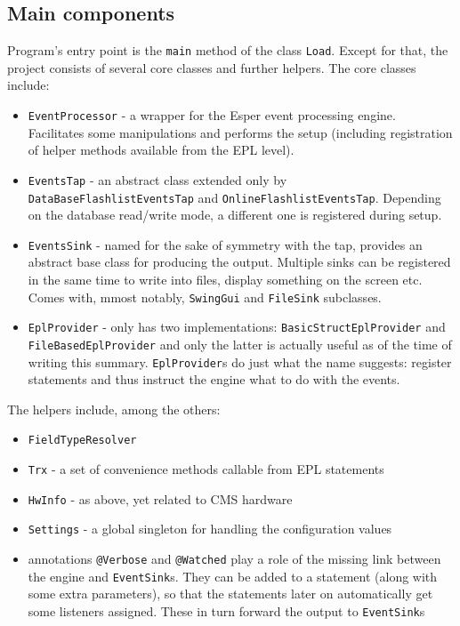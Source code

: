 \subsection{Main components}

Program's entry point is the \texttt{main} method of the class \texttt{Load}. Except for that, the project consists of several core classes and further helpers.
The core classes include:
\begin{itemize}
	\item \texttt{EventProcessor} - a wrapper for the Esper event processing engine. Facilitates some manipulations and performs the setup (including registration of helper methods available from the EPL level).
	\item \texttt{EventsTap} - an abstract class extended only by \texttt{DataBaseFlashlistEventsTap} and \texttt{OnlineFlashlistEventsTap}. Depending on the database read/write mode, a different one is registered during setup.
	\item \texttt{EventsSink} - named for the sake of symmetry with the tap, provides an abstract base class for producing the output. Multiple sinks can be registered in the same time to write into files, display something on the screen etc. Comes with, mmost notably, \texttt{SwingGui} and \texttt{FileSink} subclasses.
	\item \texttt{EplProvider} - only has two implementations: \texttt{BasicStructEplProvider} and \texttt{FileBasedEplProvider} and only the latter is actually useful as of the time of writing this summary. \texttt{EplProvider}s do just what the name suggests: register statements and thus instruct the engine what to do with the events.

\end{itemize}

The helpers include, among the others:
\begin{itemize}
	\item \texttt{FieldTypeResolver}
	\item \texttt{Trx} - a set of convenience methods callable from EPL statements
	\item \texttt{HwInfo} - as above, yet related to CMS hardware
	\item \texttt{Settings} - a global singleton for handling the configuration values
	\item annotations \texttt{@Verbose} and \texttt{@Watched} play a role of the missing link between the engine and \texttt{EventSink}s. They can be added to a statement (along with some extra parameters), so that the statements later on automatically get some listeners assigned. These in turn forward the output to \texttt{EventSink}s
\end{itemize}



